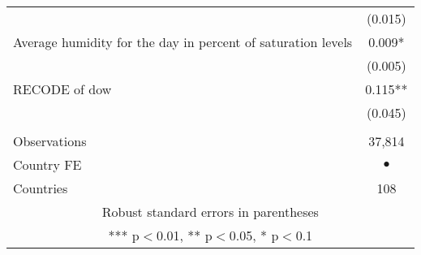 \begin{tabular}{lc}
 & (0.015) \\
Average humidity for the day in percent of saturation levels & 0.009* \\
 & (0.005) \\
RECODE of dow & 0.115** \\
 & (0.045) \\
 &  \\
Observations & 37,814 \\
Country FE & $ \bullet $ \\
 Countries & 108 \\ \hline
\multicolumn{2}{c}{ Robust standard errors in parentheses} \\
\multicolumn{2}{c}{ *** p$<$0.01, ** p$<$0.05, * p$<$0.1} \\
\end{tabular}
